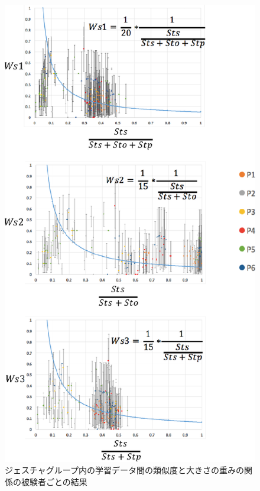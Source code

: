 \begin{figure}[!h]
\centering
\includegraphics[width=0.7\columnwidth]{img/weight_size.eps}
\caption{ジェスチャグループ内の学習データ間の類似度と大きさの重みの関係の被験者ごとの結果}
\label{fig:weight_size}
\end{figure}

